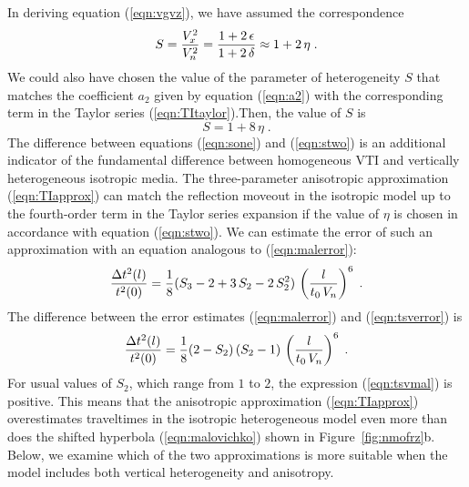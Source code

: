 
\par
In deriving equation (\ref{eqn:vgvz}), we have assumed the correspondence
\begin{equation}
S =  {V_x^2 \over V_n^2} = 
{{1 + 2\,\epsilon} \over {1 + 2\,\delta}} \approx 1 + 2\,\eta\;.
\label{eqn:sone}
\end{equation}
We could also have chosen the value of the parameter of heterogeneity $S$ that
matches the coefficient $a_2$ given by equation (\ref{eqn:a2}) with
the corresponding term in the Taylor series (\ref{eqn:TItaylor}).Then, the value of $S$ is \cite[]{GEO62-06-18391854}
\begin{equation}
S = 1 + 8\,\eta\;.
\label{eqn:stwo}
\end{equation}
The difference between equations (\ref{eqn:sone}) and (\ref{eqn:stwo}) is an
additional indicator of the fundamental difference between homogeneous 
VTI and vertically heterogeneous isotropic media. The three-parameter 
anisotropic approximation (\ref{eqn:TIapprox}) can match the
reflection moveout in the isotropic model up to 
the fourth-order term in the Taylor series expansion if the value of
$\eta$ is chosen in accordance with equation (\ref{eqn:stwo}). We can
estimate the error of such an approximation with an equation analogous
to (\ref{eqn:malerror}): 
\begin{equation}
{{\Delta t^2(l)} \over t^2(0)} = {1 \over 8} (S_3-2 + 3\,S_2-2\,S_2^2)\,
\left({l \over {t_0\,V_n}}\right)^6\;.
\label{eqn:tsverror}
\end{equation}
The difference between the error estimates (\ref{eqn:malerror}) and
(\ref{eqn:tsverror}) is
\begin{equation}
{{\Delta t^2(l)} \over t^2(0)} = {1 \over 8} (2 - S_2)\,(S_2-1)\,
\left({l \over {t_0\,V_n}}\right)^6\;.
\label{eqn:tsvmal}
\end{equation}
For usual values of 
$S_2$, which range from $1$ to $2$, the expression (\ref{eqn:tsvmal}) is 
positive. This means that the anisotropic approximation
(\ref{eqn:TIapprox}) overestimates traveltimes in the isotropic
heterogeneous model even more than does the shifted hyperbola 
(\ref{eqn:malovichko}) shown in Figure~\ref{fig:nmofrz}b. 
Below, we examine which of the two approximations is more suitable when
the model includes both vertical heterogeneity and anisotropy.

